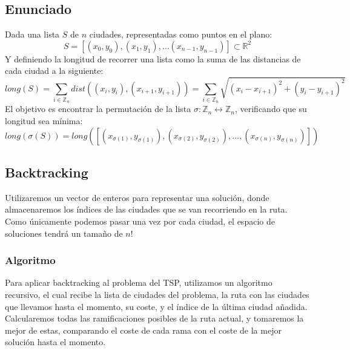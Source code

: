 \documentclass[a4paper, 11pt]{article} %
\begin{document}
  \subsection{Enunciado}
    Dada una lista $S$ de $n$ ciudades, representadas como puntos en el plano:
    \begin{equation}
      S = [(x_0,y_0), (x_1,y_1), \dots (x_{n-1},y_{n-1})] \subset \mathbb{R}^2
    \end{equation}
    Y definiendo la longitud de recorrer una lista como la suma de las distancias de cada ciudad a la siguiente:
    \begin{equation}
     long(S) = \sum_{i \in \mathbb{Z}_n} dist((x_i,y_i), (x_{i+1}, y_{i+1})) = \sum_{i \in \mathbb{Z}_n} \sqrt{(x_i-x_{i+1})^2 + (y_i-y_{i+1})^2}
    \end{equation}
    El objetivo es encontrar la permutación de la lista $\sigma : \mathbb{Z}_n \leftrightarrow \mathbb{Z}_n$, verificando que su longitud sea mínima:
    \begin{equation}
     long(\sigma(S)) = long([(x_{\sigma(1)},y_{\sigma(1)}), (x_{\sigma(2)},y_{\sigma(2)}), \dots, (x_{\sigma(n)},y_{\sigma(n)})])
    \end{equation}
    
  \subsection{Backtracking}
  
  
  Utilizaremos un vector de enteros para representar una solución, donde almacenaremos los índices de las ciudades que se van recorriendo en la ruta. Como únicamente podemos pasar una vez por cada ciudad, el espacio de soluciones tendrá un tamaño de $n!$
  
  
    \subsubsection{Algoritmo}
      Para aplicar backtracking al problema del TSP, utilizamos un algoritmo recursivo, el cual recibe la lista de 
      ciudades del problema, la ruta con las ciudades que llevamos hasta el momento, su coste, y el índice de la 
      última ciudad añadida. Calcularemos todas las ramificaciones posibles de la ruta actual, y tomaremos la mejor 
      de estas, comparando el coste de cada rama con el coste de la mejor solución hasta el momento.
      
\end{document}
